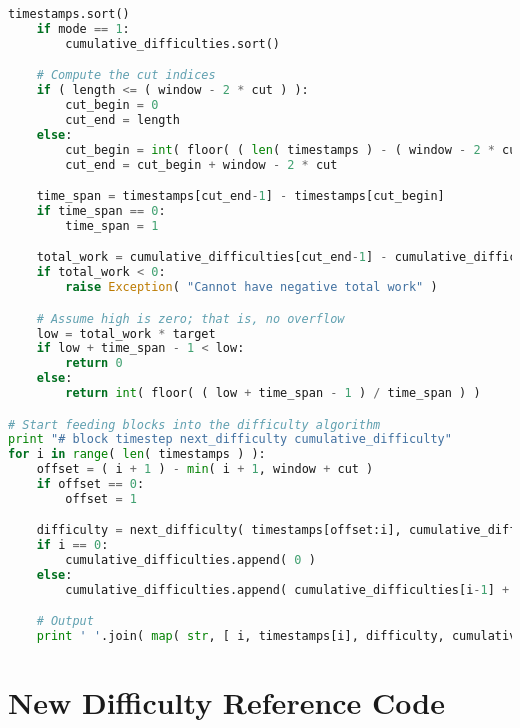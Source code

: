 \documentclass[12pt,english]{mrl}
\theoremstyle{definition}
\numberwithin{equation}{section}
\numberwithin{figure}{section}
\numberwithin{equation}{section}
\numberwithin{equation}{section}
\numberwithin{figure}{section}
\begin{document}
\begin{appendices}
\begin{lstlisting}[language=Python,basicstyle=\small,breaklines=true]
    timestamps.sort()
    if mode == 1:
        cumulative_difficulties.sort()

    # Compute the cut indices
    if ( length <= ( window - 2 * cut ) ):
        cut_begin = 0
        cut_end = length
    else:
        cut_begin = int( floor( ( len( timestamps ) - ( window - 2 * cut ) + 1 ) / 2 ) )
        cut_end = cut_begin + window - 2 * cut

    time_span = timestamps[cut_end-1] - timestamps[cut_begin]
    if time_span == 0:
        time_span = 1

    total_work = cumulative_difficulties[cut_end-1] - cumulative_difficulties[cut_begin]
    if total_work < 0:
        raise Exception( "Cannot have negative total work" )

    # Assume high is zero; that is, no overflow
    low = total_work * target
    if low + time_span - 1 < low:
        return 0
    else:
        return int( floor( ( low + time_span - 1 ) / time_span ) )

# Start feeding blocks into the difficulty algorithm
print "# block timestep next_difficulty cumulative_difficulty"
for i in range( len( timestamps ) ):
    offset = ( i + 1 ) - min( i + 1, window + cut )
    if offset == 0:
        offset = 1

    difficulty = next_difficulty( timestamps[offset:i], cumulative_difficulties[offset:i] )
    if i == 0:
        cumulative_difficulties.append( 0 )
    else:
        cumulative_difficulties.append( cumulative_difficulties[i-1] + difficulty )

    # Output
    print ' '.join( map( str, [ i, timestamps[i], difficulty, cumulative_difficulties[i] ] ) )
\end{lstlisting}


\chapter{New Difficulty Reference Code}\label{referenceCode}

\begin{lstlisting}[language=Python,basicstyle=\small,breaklines=true]

\end{lstlisting}

\end{appendices}

\medskip{}



\end{document}
